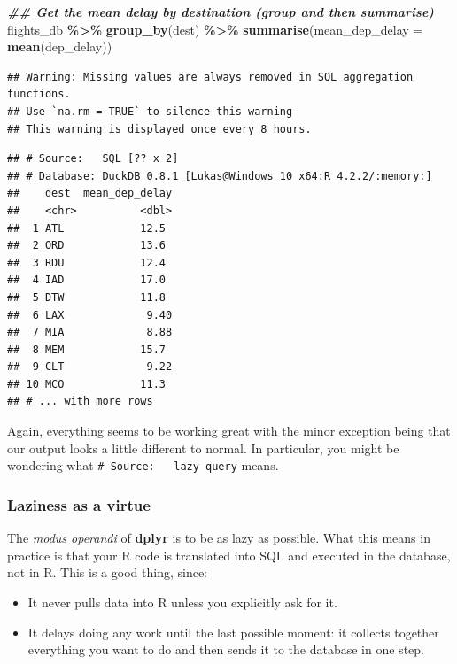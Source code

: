 \documentclass[
]{article}
\newenvironment{Shaded}{\begin{snugshade}}{\end{snugshade}}
\newcommand{\AttributeTok}[1]{\textcolor[rgb]{0.13,0.29,0.53}{#1}}
\newcommand{\DocumentationTok}[1]{\textcolor[rgb]{0.56,0.35,0.01}{\textbf{\textit{#1}}}}
\newcommand{\FunctionTok}[1]{\textcolor[rgb]{0.13,0.29,0.53}{\textbf{#1}}}
\newcommand{\NormalTok}[1]{#1}
\newcommand{\SpecialCharTok}[1]{\textcolor[rgb]{0.81,0.36,0.00}{\textbf{#1}}}
\providecommand{\tightlist}{%
  \setlength{\itemsep}{0pt}\setlength{\parskip}{0pt}}
\begin{document}
\begin{Shaded}
\begin{Highlighting}[]
\DocumentationTok{\#\# Get the mean delay by destination (group and then summarise)}
\NormalTok{flights\_db }\SpecialCharTok{\%\textgreater{}\%}
  \FunctionTok{group\_by}\NormalTok{(dest) }\SpecialCharTok{\%\textgreater{}\%}
  \FunctionTok{summarise}\NormalTok{(}\AttributeTok{mean\_dep\_delay =} \FunctionTok{mean}\NormalTok{(dep\_delay))}
\end{Highlighting}
\end{Shaded}

\begin{verbatim}
## Warning: Missing values are always removed in SQL aggregation functions.
## Use `na.rm = TRUE` to silence this warning
## This warning is displayed once every 8 hours.
\end{verbatim}

\begin{verbatim}
## # Source:   SQL [?? x 2]
## # Database: DuckDB 0.8.1 [Lukas@Windows 10 x64:R 4.2.2/:memory:]
##    dest  mean_dep_delay
##    <chr>          <dbl>
##  1 ATL            12.5 
##  2 ORD            13.6 
##  3 RDU            12.4 
##  4 IAD            17.0 
##  5 DTW            11.8 
##  6 LAX             9.40
##  7 MIA             8.88
##  8 MEM            15.7 
##  9 CLT             9.22
## 10 MCO            11.3 
## # ... with more rows
\end{verbatim}

Again, everything seems to be working great with the minor exception
being that our output looks a little different to normal. In particular,
you might be wondering what \texttt{\#\ Source:\ \ \ lazy\ query} means.

\hypertarget{laziness-as-a-virtue}{%
\subsubsection{Laziness as a virtue}\label{laziness-as-a-virtue}}

The \emph{modus operandi} of \textbf{dplyr} is to be as lazy as
possible. What this means in practice is that your R code is translated
into SQL and executed in the database, not in R. This is a good thing,
since:

\begin{itemize}
\tightlist
\item
  It never pulls data into R unless you explicitly ask for it.
\item
  It delays doing any work until the last possible moment: it collects
  together everything you want to do and then sends it to the database
  in one step.
\end{itemize}
\end{document}
